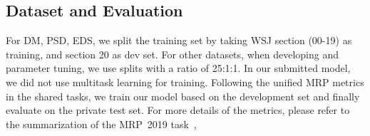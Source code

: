 \subsection{Dataset and Evaluation}
\label{ssec:data_eval}

For DM, PSD, EDS, we split the training set by taking WSJ section
(00-19) as training, and section 20 as dev set. For other datasets,
when developing and parameter tuning, we use splits with a ratio of
25:1:1. In our submitted model, we did not use multitask learning for
training. Following the unified MRP metrics in the shared tasks, we train our
model based on the development set and finally evaluate on the private
test set.  For more details of the metrics, please refer to the
summarization of the MRP~2019 task~\cite{Oep:Abe:Haj:19},

